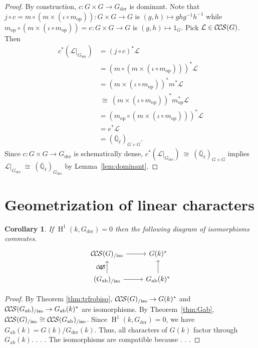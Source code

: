 \documentclass[10pt]{amsart}
\theoremstyle{plain}
\newtheorem{corollary}[theorem]{Corollary}
\theoremstyle{definition}
\newcommand{\EE}{\mathbb{\bar Q}_\ell}
\newcommand{\Fq}{k}
\DeclareMathOperator{\Hh}{H}
\newcommand{\op}{_{\operatorname{op}}}
\newcommand{\der}{_{\operatorname{der}}}
\newcommand{\ab}{_{\operatorname{ab}}}
\newcommand{\iso}{{\ \cong\ }}
\newcommand{\cs}[1]{{\mathcal{#1}}}
\newcommand{\CS}{{\mathcal{C\hskip-0.8pt S}}}
\newcommand{\CCS}{{\mathcal{C\hskip-.8pt C\hskip-0.8pt S}}}
\newcommand{\CCSiso}[1]{\CCS(#1)_{/\text{iso}}}
\begin{document}
\begin{proof}
By construction, $c : G \times G \to G\der$ is dominant. 
Note that $j\circ c = m\circ (m \times (\iota\circ m\op)) : G \times G \to G$ is $(g,h) \mapsto gh g^{-1}h^{-1}$ while $m\op\circ (m \times (\iota\circ m\op))= e : G \times G \to G$ is $(g,h) \mapsto 1_G$. 
Pick $\cs{L}\in \CCS(G)$. 
Then
\begin{align*}
c^* (\cs{L}\vert_{G\der})
&=  (j\circ c)^*\cs{L} \\
&= (m\circ (m \times (\iota\circ m\op)))^* \cs{L} \\
&= (m \times (\iota\circ m\op))^* m^* \cs{L} \\
&\iso (m \times (\iota\circ m\op))^* m\op^* \cs{L} \\
&= (m\op\circ (m \times (\iota\circ m\op)))^* \cs{L} \\
&= e^* \cs{L}\\
&= (\EE)_{G\times G}.
\end{align*}
Since $c : G \times G \to G\der$ is schematically dense, $c^* (\cs{L}\vert_{G\der}) \iso (\EE)_{G\times G}$ implies $\cs{L}\vert_{G\der} \iso (\EE)_{G\der}$ by Lemma~\ref{lem:dominant}.

\end{proof}

\section{Geometrization of linear characters}


 \begin{corollary}
 If $\Hh^1(\Fq,G\der)=0$ then
the following diagram of isomorphisms commutes.
\[
\begin{tikzcd}
\CCSiso{G} \arrow{r} & G(\Fq)^*\\
\arrow{u}{q^*} \CCSiso{G\ab} \arrow{r} & \arrow{u} G\ab(\Fq)^* 
\end{tikzcd}
\]
 \end{corollary}
 
 \begin{proof}
 By Theorem \ref{thm:trfrobiso}, $\CCSiso{G}\to G(\Fq)^*$ and $\CCSiso{G\ab}\to G\ab(\Fq)^*$ are isomorphisms.
By Theorem~\ref{thm:Gab}, $\CCSiso{G} \iso \CCSiso{G\ab}$.
Since $\Hh^1(\Fq,G\der)=0$, we have  $G\ab(\Fq) = G(\Fq)/G\der(\Fq)$.
Thus, all characters of $G(\Fq)$ factor through
 $G\ab(\Fq)$. . . . 
 The isomorphisms are compatible because  . . . 
 \end{proof}
\end{document}
